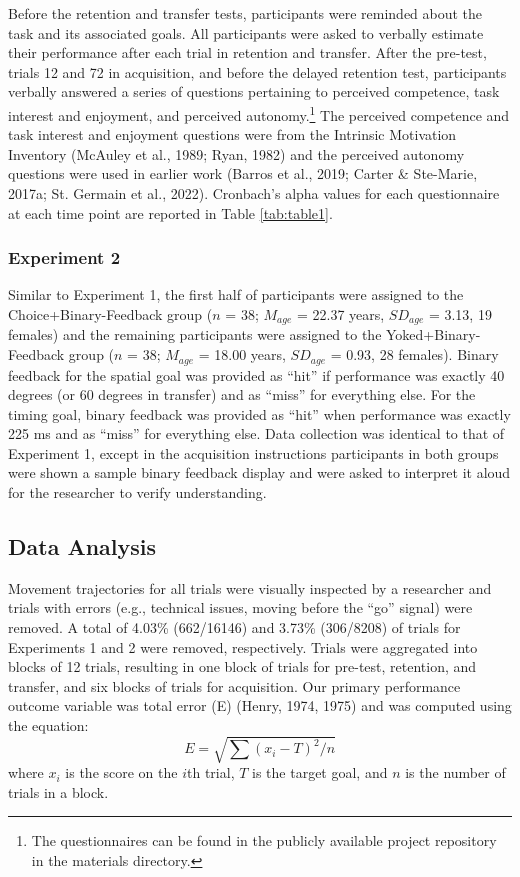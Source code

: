 \documentclass[
  doc, donotrepeattitle,floatsintext]{apa7}
\begin{document}
Before the retention and transfer tests, participants were reminded about the task and its associated goals. All participants were asked to verbally estimate their performance after each trial in retention and transfer. After the pre-test, trials 12 and 72 in acquisition, and before the delayed retention test, participants verbally answered a series of questions pertaining to perceived competence, task interest and enjoyment, and perceived autonomy.\footnote{The questionnaires can be found in the publicly available project repository in the materials directory.} The perceived competence and task interest and enjoyment questions were from the Intrinsic Motivation Inventory (McAuley et al., 1989; Ryan, 1982) and the perceived autonomy questions were used in earlier work (Barros et al., 2019; Carter \& Ste-Marie, 2017a; St. Germain et al., 2022). Cronbach's alpha values for each questionnaire at each time point are reported in Table \ref{tab:table1}.

\hypertarget{experiment-2-1}{%
\subsubsection{Experiment 2}\label{experiment-2-1}}

Similar to Experiment 1, the first half of participants were assigned to the Choice+Binary-Feedback group (\(n\) = 38; \(M_{age}\) = 22.37 years, \(SD_{age}\) = 3.13, 19 females) and the remaining participants were assigned to the Yoked+Binary-Feedback group (\(n\) = 38; \(M_{age}\) = 18.00 years, \(SD_{age}\) = 0.93, 28 females). Binary feedback for the spatial goal was provided as ``hit'' if performance was exactly 40 degrees (or 60 degrees in transfer) and as ``miss'' for everything else. For the timing goal, binary feedback was provided as ``hit'' when performance was exactly 225 ms and as ``miss'' for everything else. Data collection was identical to that of Experiment 1, except in the acquisition instructions participants in both groups were shown a sample binary feedback display and were asked to interpret it aloud for the researcher to verify understanding.

\hypertarget{data-analysis}{%
\subsection{Data Analysis}\label{data-analysis}}

Movement trajectories for all trials were visually inspected by a researcher and trials with errors (e.g., technical issues, moving before the ``go'' signal) were removed. A total of 4.03\% (662/16146) and 3.73\% (306/8208) of trials for Experiments 1 and 2 were removed, respectively. Trials were aggregated into blocks of 12 trials, resulting in one block of trials for pre-test, retention, and transfer, and six blocks of trials for acquisition. Our primary performance outcome variable was total error (E) (Henry, 1974, 1975) and was computed using the equation:
\begin{equation}
E = \sqrt{\sum{(x_{i} - T)^2 / n}}
\end{equation}
where \(x_{i}\) is the score on the \(i\)th trial, \(T\) is the target goal, and \(n\) is the number of trials in a block.
\end{document}
